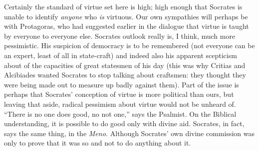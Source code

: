 \documentclass[11pt]{amsart}
\begin{document}
Certainly the standard of virtue set here is high; high enough that Socrates is unable to identify \emph{anyone} who \emph{is} virtuous. Our own sympathies will perhaps be with Protagoras, who had suggested earlier in the dialogue that virtue is taught by everyone to everyone else. Socrates outlook really is, I think, much more pessimistic. His suspicion of democracy is to be remembered (not everyone can be an expert, least of all in state-craft) and indeed also his apparent scepticism about of the capacities of great statesmen of his day (this was why Critias and Alcibiades wanted Socrates to stop talking about craftsmen: they thought they were being made out to measure up badly against them). Part of the issue is perhaps that Socrates' conception of virtue is more political than ours, but leaving that aside, radical pessimism about virtue would not be unheard of. ``There is no one does good, no not one,'' says the Psalmist. On the Biblical understanding, it is possible to do good only with divine aid. Socrates, in fact, says the same thing, in the \emph{Meno.} Although Socrates' own divine commission was only to prove that it was so and not to do anything about it.
\end{document}
